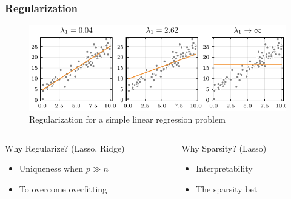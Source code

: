 \documentclass[aspectratio=1610,onlytextwidth]{beamer}
\begin{document}
\begin{frame}[c]
  \frametitle{Regularization}

  \begin{figure}[htpb]
    \centering
    \includegraphics[]{figures/regularization-illustration.pdf}
    \caption{%
      Regularization for a simple linear regression problem
    }
  \end{figure}

  \pause
  \begin{columns}[T]
    \begin{column}{0.45\textwidth}
      \begin{block}{Why Regularize? (Lasso, Ridge)}
        \begin{itemize}
          \item Uniqueness when \(p \gg n\)
          \item To overcome overfitting
        \end{itemize}
      \end{block}
    \end{column}
    \pause
    \begin{column}{0.45\textwidth}
      \begin{block}{Why Sparsity? (Lasso)}
        \begin{itemize}
          \item Interpretability
          \item The sparsity bet
        \end{itemize}
      \end{block}
    \end{column}
  \end{columns}

\end{frame}

\end{document}
